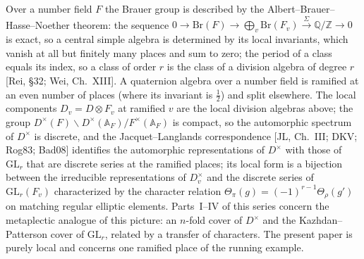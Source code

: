 \documentclass[11pt]{article}
\newcommand{\Z}{\mathbb Z}
\newcommand{\Q}{\mathbb Q}
\theoremstyle{plain}
\theoremstyle{definition}
\begin{document}
Over a number field $F$ the Brauer group is described by the
Albert--Brauer--Hasse--Noether theorem: the sequence
$0\to\mathrm{Br}(F)\to\bigoplus_v\mathrm{Br}(F_v)\xrightarrow{\ \Sigma\ }\Q/\Z\to0$
is exact, so a central simple algebra is determined by its local
invariants, which vanish at all but finitely many places and sum to
zero; the period of a class equals its index, so a class of order $r$ is
the class of a division algebra of degree $r$ [Rei, \S32; Wei, Ch.~XIII].
A quaternion algebra over a number field is ramified at an even number
of places (where its invariant is $\tfrac12$) and split elsewhere.  The
local components $D_v=D\otimes F_v$ at ramified $v$ are the local
division algebras above; the group $D^\times(F)\backslash D^\times(\mathbb A_F)/F^\times(\mathbb A_F)$
is compact, so the automorphic spectrum of $D^\times$ is discrete, and
the Jacquet--Langlands correspondence [JL, Ch.~III; DKV; Rog83; Bad08]
identifies the automorphic representations of $D^\times$ with those of
$\mathrm{GL}_r$ that are discrete series at the ramified places; its
local form is a bijection between the irreducible representations of
$D_v^\times$ and the discrete series of $\mathrm{GL}_r(F_v)$ characterized
by the character relation $\Theta_\pi(g)=(-1)^{r-1}\Theta_\rho(g')$ on
matching regular elliptic elements.  Parts~I--IV of this series concern
the metaplectic analogue of this picture: an $n$-fold cover of
$D^\times$ and the Kazhdan--Patterson cover of $\mathrm{GL}_r$, related
by a transfer of characters.  The present paper is purely local and
concerns one ramified place of the running example.
\end{document}
